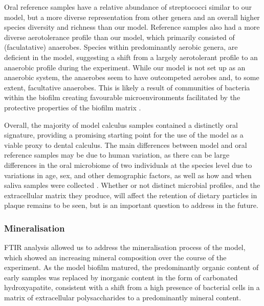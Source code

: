 \documentclass[10pt,a4paper]{article}
\begin{document}
Oral reference samples have a relative abundance of streptococci similar
to our model, but a more diverse representation from other genera and an
overall higher species diversity and richness than our model. Reference
samples also had a more diverse aerotolerance profile than our model,
which primarily consisted of (faculatative) anaerobes. Species within
predominantly aerobic genera, are deficient in the model, suggesting a
shift from a largely aerotolerant profile to an anaerobic profile during
the experiment. While our model is not set up as an anaerobic system,
the anaerobes seem to have outcompeted aerobes and, to some extent,
facultative anaerobes. This is likely a result of communities of
bacteria within the biofilm creating favourable microenvironments
facilitated by the protective properties of the biofilm matrix
\citep{flemmingBiofilmsEmergent2016, edlundUncoveringComplex2018}.

Overall, the majority of model calculus samples contained a distinctly
oral signature, providing a promising starting point for the use of the
model as a viable proxy to dental calculus. The main differences between
model and oral reference samples may be due to human variation, as there
can be large differences in the oral microbiome of two individuals at
the species level due to variations in age, sex, and other demographic
factors, as well as how and when saliva samples were collected
\citep{burchamPatternsOral2020, nearingAssessingVariation2020}. Whether
or not distinct microbial profiles, and the extracellular matrix they
produce, will affect the retention of dietary particles in plaque
remains to be seen, but is an important question to address in the
future.

\subsubsection{Mineralisation}\label{mineralisation}

FTIR analysis allowed us to address the mineralisation process of the
model, which showed an increasing mineral composition over the course of
the experiment. As the model biofilm matured, the predominantly organic
content of early samples was replaced by inorganic content in the form
of carbonated hydroxyapatite, consistent with a shift from a high
presence of bacterial cells in a matrix of extracellular polysaccharides
\citep{jainIsolationCharacterization2013, sutherlandBiofilmMatrix2001, zhangMeasurementPolysaccharides1998}
to a predominantly mineral content.
\end{document}
